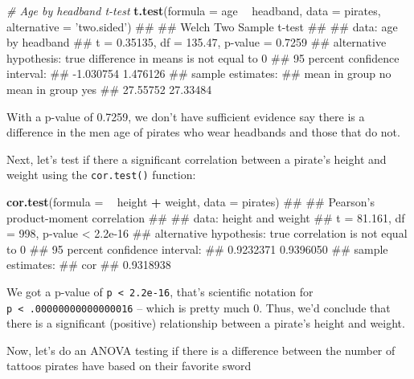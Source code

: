 \documentclass[]{book}
\newenvironment{Shaded}{\begin{snugshade}}{\end{snugshade}}
\newcommand{\KeywordTok}[1]{\textcolor[rgb]{0.13,0.29,0.53}{\textbf{#1}}}
\newcommand{\DataTypeTok}[1]{\textcolor[rgb]{0.13,0.29,0.53}{#1}}
\newcommand{\StringTok}[1]{\textcolor[rgb]{0.31,0.60,0.02}{#1}}
\newcommand{\CommentTok}[1]{\textcolor[rgb]{0.56,0.35,0.01}{\textit{#1}}}
\newcommand{\OperatorTok}[1]{\textcolor[rgb]{0.81,0.36,0.00}{\textbf{#1}}}
\newcommand{\NormalTok}[1]{#1}
\theoremstyle{definition}
\theoremstyle{definition}
\theoremstyle{remark}
\begin{document}
\begin{Shaded}
\begin{Highlighting}[]
\CommentTok{# Age by headband t-test}
\KeywordTok{t.test}\NormalTok{(}\DataTypeTok{formula =}\NormalTok{ age }\OperatorTok{~}\StringTok{ }\NormalTok{headband,}
       \DataTypeTok{data =}\NormalTok{ pirates,}
       \DataTypeTok{alternative =} \StringTok{'two.sided'}\NormalTok{)}
\NormalTok{## }
\NormalTok{##  Welch Two Sample t-test}
\NormalTok{## }
\NormalTok{## data:  age by headband}
\NormalTok{## t = 0.35135, df = 135.47, p-value = 0.7259}
\NormalTok{## alternative hypothesis: true difference in means is not equal to 0}
\NormalTok{## 95 percent confidence interval:}
\NormalTok{##  -1.030754  1.476126}
\NormalTok{## sample estimates:}
\NormalTok{##  mean in group no mean in group yes }
\NormalTok{##          27.55752          27.33484}
\end{Highlighting}
\end{Shaded}

With a p-value of 0.7259, we don't have sufficient evidence say there is
a difference in the men age of pirates who wear headbands and those that
do not.

Next, let's test if there a significant correlation between a pirate's
height and weight using the \texttt{cor.test()} function:

\begin{Shaded}
\begin{Highlighting}[]
\KeywordTok{cor.test}\NormalTok{(}\DataTypeTok{formula =} \OperatorTok{~}\StringTok{ }\NormalTok{height }\OperatorTok{+}\StringTok{ }\NormalTok{weight,}
         \DataTypeTok{data =}\NormalTok{ pirates)}
\NormalTok{## }
\NormalTok{##  Pearson's product-moment correlation}
\NormalTok{## }
\NormalTok{## data:  height and weight}
\NormalTok{## t = 81.161, df = 998, p-value < 2.2e-16}
\NormalTok{## alternative hypothesis: true correlation is not equal to 0}
\NormalTok{## 95 percent confidence interval:}
\NormalTok{##  0.9232371 0.9396050}
\NormalTok{## sample estimates:}
\NormalTok{##       cor }
\NormalTok{## 0.9318938}
\end{Highlighting}
\end{Shaded}

We got a p-value of \texttt{p\ \textless{}\ 2.2e-16}, that's scientific
notation for \texttt{p\ \textless{}\ .00000000000000016} -- which is
pretty much 0. Thus, we'd conclude that there is a significant
(positive) relationship between a pirate's height and weight.

Now, let's do an ANOVA testing if there is a difference between the
number of tattoos pirates have based on their favorite sword
\end{document}
